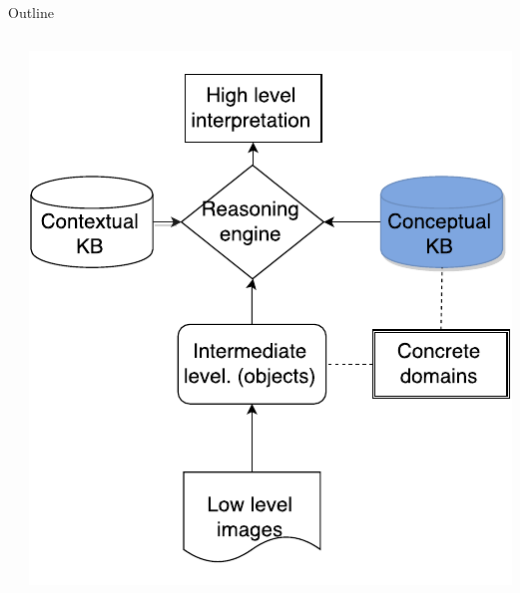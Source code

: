 \documentclass{beamer}
\begin{document}
% 

\begin{frame}{Outline}
\begin{columns}
 \begin{column}{0.6\textwidth}
  \tableofcontents[currentsection,hideothersubsections,subsectionstyle=show/shaded]
 \end{column}

 \begin{column}{.4\textwidth}
  \includegraphics[width=.9\textwidth]{images/flowchart_kb_crop.pdf}
 \end{column}
\end{columns}
\end{frame}
\end{document}
